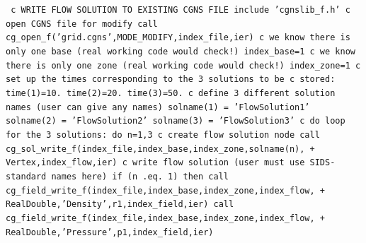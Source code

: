 \documentclass[12pt]{article}
\begin{document}
{\tt
\noindent c   WRITE FLOW SOLUTION TO EXISTING CGNS FILE
\newline\indent      include 'cgnslib\_f.h'
\newline c   open CGNS file for modify
\newline\indent      call cg\_open\_f('grid.cgns',MODE\_MODIFY,index\_file,ier)
\newline c   we know there is only one base (real working code would check!)
\newline\indent      index\_base=1
\newline c   we know there is only one zone (real working code would check!)
\newline\indent      index\_zone=1
\newline c   set up the times corresponding to the 3 solutions to be
\newline c   stored:
\newline\indent      time(1)=10.
\newline\indent      time(2)=20.
\newline\indent      time(3)=50.
\newline c   define 3 different solution names (user can give any names)
\newline\indent      solname(1) = 'FlowSolution1'
\newline\indent      solname(2) = 'FlowSolution2'
\newline\indent      solname(3) = 'FlowSolution3'
\newline c   do loop for the 3 solutions:
\newline\indent      do n=1,3
\newline c   create flow solution node
\newline\indent      call cg\_sol\_write\_f(index\_file,index\_base,index\_zone,solname(n),
\newline + \indent Vertex,index\_flow,ier)
\newline c   write flow solution (user must use SIDS-standard names here)
\newline\indent      if (n .eq. 1) then
\newline\indent      call cg\_field\_write\_f(index\_file,index\_base,index\_zone,index\_flow,
\newline + \indent RealDouble,'Density',r1,index\_field,ier)
\newline\indent      call cg\_field\_write\_f(index\_file,index\_base,index\_zone,index\_flow,
\newline + \indent RealDouble,'Pressure',p1,index\_field,ier)
}
\end{document}
